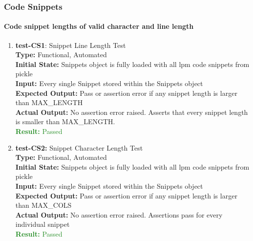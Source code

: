 \documentclass[12pt, titlepage]{article}
\begin{document}
\subsubsection{Code Snippets}

\paragraph{Code snippet lengths of valid character and line length}
\begin{enumerate}
\item{\textbf{test-CS1}: Snippet Line Length Test\\}
\textbf{Type:} Functional, Automated \\
\textbf{Initial State:} Snippets object is fully loaded with all lpm code snippets from pickle\\
\textbf{Input:} Every single Snippet stored within the Snippets object \\
\textbf{Expected Output:} Pass or assertion error if any snippet length is larger than MAX\_LENGTH\\
\textbf{Actual Output:} No assertion error raised. Asserts that every snippet length is smaller than MAX\_LENGTH. \\
\textcolor{ForestGreen}{\textbf{Result:} Passed}

\item{\textbf{test-CS2:} Snippet Character Length Test\\}
\textbf{Type:} Functional, Automated \\
\textbf{Initial State:} Snippets object is fully loaded with all lpm code snippets from pickle\\
\textbf{Input:} Every single Snippet stored within the Snippets object \\
\textbf{Expected Output:} Pass or assertion error if any snippet length is larger than MAX\_COLS\\
\textbf{Actual Output:} No assertion error raised. Assertions pass for every individual snippet\\
\textcolor{ForestGreen}{\textbf{Result:} Passed}
\end{enumerate}
\end{document}
